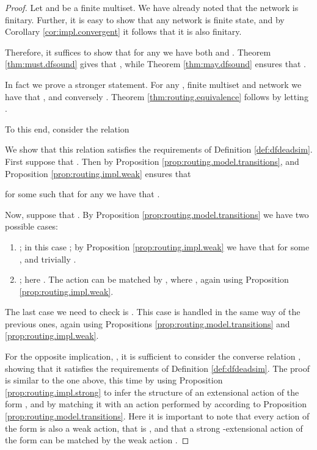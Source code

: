 \documentclass{LMCS}
\begin{document}
\begin{proof}
Let  and  be a finite multiset. 
We have already noted that the network   
is finitary. Further, it is easy to show that any network 
 is finite state, 
and by Corollary \ref{cor:impl.convergent} it follows that 
it is also finitary.

Therefore, it suffices to show that for any  
we have both  and 
. Theorem 
\ref{thm:must.dfsound} gives that , while Theorem \ref{thm:may.dfsound} ensures that 
. 

In fact we prove a stronger statement. 
For any , finite multiset  
and network  
we have that , 
and conversely .
Theorem \ref{thm:routing.equivalence} follows by 
letting .

To this end, consider the relation

\noindent
We show that this relation satisfies the requirements of 
Definition \ref{def:dfdeadsim}. 
First suppose that . 
Then  by Proposition 
\ref{prop:routing.model.transitions}, and
Proposition \ref{prop:routing.impl.weak} ensures that 
 
for some  such that for any  
we have that . 

Now, suppose that . 
By Proposition \ref{prop:routing.model.transitions} we have 
two possible cases: 

\begin{enumerate}
\item ; in this case ; 
by Proposition \ref{prop:routing.impl.weak} we have 
that  for some , and trivially 
. 
\item ; here . 
The action  
can be matched by , 
where , 
again using Proposition \ref{prop:routing.impl.weak}.
\end{enumerate}

\noindent The last case we need to check is . 
This case is handled in the same way of the previous ones, again using 
Propositions \ref{prop:routing.model.transitions} 
and \ref{prop:routing.impl.weak}.

For the opposite implication, ,
it is sufficient to consider the converse relation , 
showing that it satisfies the requirements of Definition \ref{def:dfdeadsim}.
The proof is similar to the one above, this time by using 
Proposition \ref{prop:routing.impl.strong} to infer the 
structure of an extensional action of the form 
, and by matching 
it with an action performed by  
according to Proposition \ref{prop:routing.model.transitions}. 
Here it is important to note that every action of the 
form  is also a  
weak action, that is , 
and that a strong -extensional action of the form 
 can be matched by the weak 
action .
\end{proof}
\end{document}
